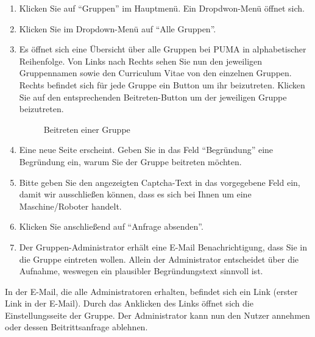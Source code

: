 \begin{enumerate}
    \item Klicken Sie auf \enquote{Gruppen} im Hauptmenü. Ein Dropdwon-Menü öffnet sich.
    \item Klicken Sie im Dropdown-Menü auf \enquote{Alle Gruppen}.
    \item Es öffnet sich eine Übersicht über alle Gruppen bei PUMA in alphabetischer Reihenfolge. Von Links nach Rechts sehen Sie nun den jeweiligen Gruppennamen sowie den Curriculum Vitae von den einzelnen Gruppen. Rechts befindet sich für jede Gruppe ein Button um ihr beizutreten. Klicken Sie auf den entsprechenden Beitreten-Button um der jeweiligen Gruppe beizutreten.
\begin{figure}[h!]
 \centering
 \caption{Beitreten einer Gruppe}
 \label{fig:gruppeBeitreten}
\end{figure}
    \item Eine neue Seite erscheint. Geben Sie in das Feld \enquote{Begründung} eine Begründung ein, warum Sie der Gruppe beitreten möchten.
    \item Bitte geben Sie den angezeigten Captcha-Text in das vorgegebene Feld ein, damit wir ausschließen können, dass es sich bei Ihnen um eine Maschine/Roboter handelt.
    \item Klicken Sie anschließend auf \enquote{Anfrage absenden}.
    \item Der Gruppen-Administrator erhält eine E-Mail Benachrichtigung, dass Sie in die Gruppe eintreten wollen. Allein der Administrator entscheidet über die Aufnahme, weswegen ein plausibler Begründungstext sinnvoll ist.
\end{enumerate}
In der E-Mail, die alle Administratoren erhalten, befindet sich ein Link (erster Link in der E-Mail). Durch das Anklicken des Links öffnet sich die Einstellungsseite der Gruppe. Der Administrator kann nun den Nutzer annehmen oder dessen Beitrittsanfrage ablehnen.

